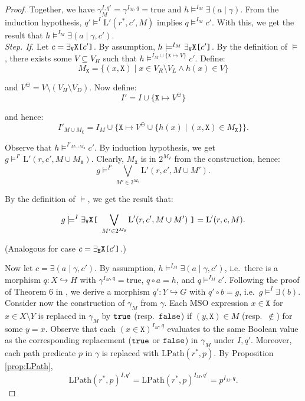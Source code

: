 \documentclass{llncs}
\newcommand{\mt}[1]{\text{\tt{#1}}}
\begin{document}
\begin{proof}
		\noindent Together, we have $\gamma_M^{I,q'} = \gamma^{I_M,q} = \text{true}$ and $h \models^{I_M} \exists(a\mid\gamma)$. From the induction hypothesis, $q' \models^I \text{L}'(r^*,c',M)$ implies $q \models^{I_M} c'$. With this, we get the result that $h \models^{I_M} \exists (a \mid \gamma, c')$.\\
		



		
		\noindent\emph{Step. If.} Let $c = \exists_\mathtt{V}\mathtt{X}\mt{[}c'\mt{]}$. By assumption, $h \models^{I_M} \exists_\mathtt{V}\mathtt{X}\mt{[}c'\mt{]}$. By the definition of $\models$, there exists some $V\subseteq V_H$ such that $h \models^{I_M \cup \{\mathtt{X}\mapsto V\}} c'$. Define:
		\[M_\mathtt{X} = \{ (x,\mathtt{X}) \mid x\in V_R\setminus V_L \wedge h(x) \in V \}\]
		
		\noindent and $V^\ominus = V \setminus (V_H\setminus V_D)$. Now define:
		\[ I' = I \cup \{\mathtt{X}\mapsto V^\ominus\} \]
		
		\noindent and hence:
		\[ I'_{M\cup M_\mathtt{X}} = I_M \cup \{\mathtt{X}\mapsto V^\ominus \cup \{h(x) \mid (x,\mathtt{X})\in M_\mathtt{X}\} \}. \]
		
		\noindent Observe that $h \models^{I'_{M\cup M_\mathtt{X}}} c'$. By induction hypothesis, we get $g \models^{I'} \text{L}'(r,c',M\cup M_\mathtt{X})$. Clearly, $M_\mathtt{X}$ is in $2^{M_\mathtt{V}}$ from the construction, hence:
		\[g\models^{I'}  \bigvee_{M'\in 2^{M_\mathtt{V}}}\text{L}'(r,c',M\cup M').\]
		
		\noindent By the definition of $\models$, we get the result that:
		
		\[g\models^{I}  \exists_\mathtt{V}\mathtt{X}\mt{[}\ \bigvee_{M'\in 2^{M_\mathtt{V}}}\text{L}'(r,c',M\cup M')\ \mt{]} = \text{L}'(r,c,M).\]
		
		\noindent (Analogous for case $c = \exists_\mathtt{E}\mathtt{X}\mt{[}c'\mt{]}$.)
		
		Now let $c = \exists (a\mid \gamma, c')$. By assumption, $h \models^{I_M} \exists (a\mid \gamma, c')$, i.e.\ there is a morphism $q\!:X\hookrightarrow H$ with $\gamma^{I_M,q} = \text{true}$, $q\circ a = h$, and $q \models^{I_M} c'$. Following the proof of Theorem 6 in \cite{Habel-Pennemann09a}, we derive a morphism $q'\!: Y \hookrightarrow G$ with $q' \circ b = g$, i.e.\ $g \models^I \exists(b)$. Consider now the construction of $\gamma_M$ from $\gamma$. Each MSO expression $x\in\mathtt{X}$ for $x\in X \setminus Y$ is replaced in $\gamma_M$ by $\tt true$ (resp.\ $\tt false$) if $(y,\mathtt{X})\in M$ (resp.\ $\notin$) for some $y = x$. Observe that each $(x\in\mathtt{X})^{I_M,q}$ evaluates to the same Boolean value as the corresponding replacement ($\tt true$ or $\tt false$) in $\gamma_M$ under $I,q'$. Moreover, each path predicate $p$ in $\gamma$ is replaced with $\text{LPath}(r^*,p)$. By Proposition \ref{prop:LPath},
		\[ \text{LPath}(r^*,p)^{I,q'} = \text{LPath}(r^*,p)^{I_M,q'} = p^{I_M,q}. \]
		

\end{proof}
\end{document}
